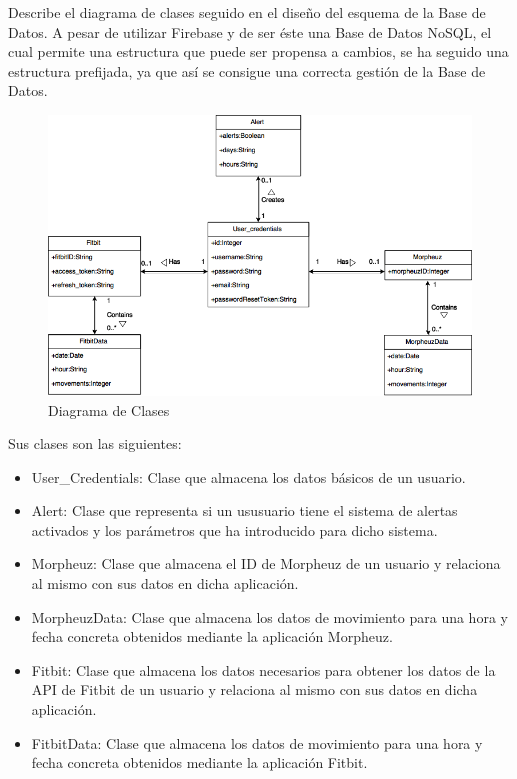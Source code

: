\documentclass[11pt,openany]{book}
\begin{document}
Describe el diagrama de clases seguido en el diseño del esquema de la Base de Datos. A pesar de utilizar Firebase y de ser éste una Base de Datos NoSQL, el cual permite una estructura que puede ser propensa a cambios, se ha seguido una estructura prefijada, ya que así se consigue una correcta gestión de la Base de Datos.

\begin{figure}[H]
\centering
\includegraphics[totalheight=8cm]{diagramas/Diagrama_de_Clases.png}
\caption{Diagrama de Clases}
\end{figure}

Sus clases son las siguientes:

\begin{itemize}
\item User\_Credentials: Clase que almacena los datos básicos de un usuario.
\item Alert: Clase que representa si un ususuario tiene el sistema de alertas activados y los parámetros que ha introducido para dicho sistema.
\item Morpheuz: Clase que almacena el ID de Morpheuz de un usuario y relaciona al mismo con sus datos en dicha aplicación.
\item MorpheuzData: Clase que almacena los datos de movimiento para una hora y fecha concreta obtenidos mediante la aplicación Morpheuz.
\item Fitbit: Clase que almacena los datos necesarios para obtener los datos de la API de Fitbit de un usuario y relaciona al mismo con sus datos en dicha aplicación.
\item FitbitData: Clase que almacena los datos de movimiento para una hora y fecha concreta obtenidos mediante la aplicación Fitbit.

\end{itemize}
\end{document}
